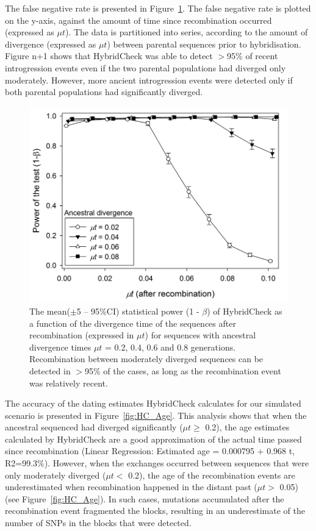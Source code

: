 The false negative rate is presented in Figure~\ref{fig:HC_Power}. The false negative rate is plotted on the y-axis, against the amount of time since recombination occurred (expressed as $\mu t$). The data is partitioned into series, according to the amount of divergence (expressed as $\mu t$) between parental sequences prior to hybridisation. Figure n+1 shows that HybridCheck was able to detect $>$95\% of recent introgression events even if the two parental populations had diverged only moderately. However, more ancient introgression events were detected only if both parental populations had significantly diverged.

\begin{figure}
	\includegraphics{Figures/HybridCheck/HC_Power}
    \caption{\label{fig:HC_Power}The mean($\pm$5 – 95\%CI) statistical power (1 - $\beta$) of HybridCheck as a function of the divergence time of the sequences after recombination (expressed in $\mu t$) for sequences with ancestral divergence times $\mu t$ = 0.2, 0.4, 0.6 and 0.8 generations. Recombination between moderately diverged sequences can be detected in $>$95\% of the cases, as long as the recombination event was relatively recent.}
\end{figure}

The accuracy of the dating estimates HybridCheck calculates for our simulated scenario is presented in Figure~\ref{fig:HC_Age}. This analysis shows that when the ancestral sequenced had diverged significantly ($\mu t \geq$ 0.2), the age estimates calculated by HybridCheck are a good approximation of the actual time passed since recombination (Linear Regression: Estimated age = 0.000795 + 0.968 t, R2=99.3\%). However, when the exchanges occurred between sequences that were only moderately diverged ($\mu t <$ 0.2), the age of the recombination events are underestimated when recombination happened in the distant past ($\mu t >$ 0.05) (see Figure~\ref{fig:HC_Age}). In such cases, mutations accumulated after the recombination event fragmented the blocks, resulting in an underestimate of the number of SNPs in the blocks that were detected.


